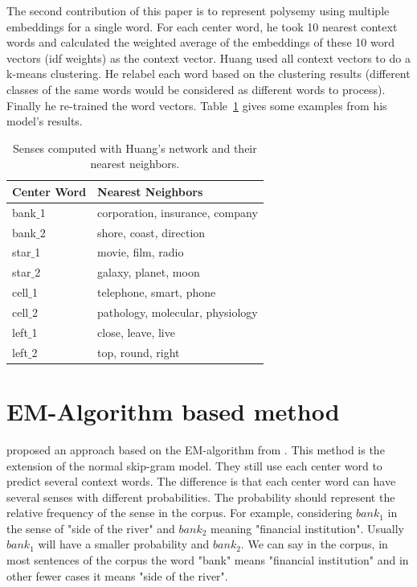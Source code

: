 The second contribution of this paper is to represent polysemy using multiple embeddings for a single word. For each center word, he took 10 nearest context words and calculated the weighted average of the embeddings of these 10 word vectors (idf weights) as the context vector. Huang used all context vectors to do a k-means clustering. He relabel  each word  based on the clustering results (different classes of the same words would be considered as different words to process). Finally he re-trained the word vectors. Table~\ref{tab:huang} gives some examples from his model's results.\\


\begin{table}[tb]
\begin{center}
\caption{Senses computed with Huang's network and their nearest neighbors.} 
\label{tab:huang}
\vspace{2mm}
 \begin{tabular}{|l|l|}
  \hline
  Center Word &Nearest Neighbors \\
  \hline  
  bank$\_$1 & corporation, insurance, company\\
  \hline
  bank$\_$2 & shore, coast, direction\\
  \hline
  star$\_$1 & movie, film, radio\\
  \hline
  star$\_$2 & galaxy, planet, moon\\
  \hline
  cell$\_$1 & telephone, smart, phone\\
  \hline
  cell$\_$2 & pathology, molecular, physiology\\
  \hline
  left$\_$1 & close, leave, live\\
  \hline
  left$\_$2 & top, round, right\\
  \hline
 \end{tabular}
\end{center}
\end{table}

\section{EM-Algorithm based method}


\cite{TianDaiEtAl2014} proposed an approach based on the EM-algorithm from . This method is the extension of the normal skip-gram model. They still use each center word to predict several context words. The difference is that each center word can have several senses with different probabilities. The probability should represent the relative frequency of the sense in the corpus. For example, considering $bank_1$ in the sense of "side of the river" and $bank_2$ meaning "financial institution". Usually $bank_1$ will have a smaller probability and $bank_2$. We can say in the corpus, in most sentences of the corpus the word "bank" means "financial institution" and in other fewer cases it means "side of the river". 

